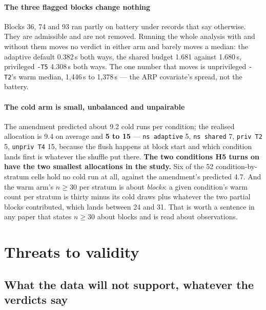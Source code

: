 \documentclass[conference]{IEEEtran}
\begin{document}
\paragraph*{The three flagged blocks change nothing} Blocks 36, 74 and 93 ran
partly on battery under records that say otherwise. They are admissible and are
not removed. Running the whole analysis with and without them moves no verdict
in either arm and barely moves a median: the adaptive default 0.382\,s both
ways, the shared budget 1.681 against 1.680\,s, privileged \texttt{-T5}
4.308\,s both ways. The one number that moves is unprivileged \texttt{-T2}'s
warm median, 1{,}446\,s to 1{,}378\,s --- the ARP covariate's spread, not the
battery.

\paragraph*{The cold arm is small, unbalanced and unpairable} The amendment
predicted about 9.2 cold runs per condition; the realised allocation is 9.4 on
average and \textbf{5 to 15} --- \texttt{ns adaptive} 5, \texttt{ns shared} 7, \texttt{priv T2} 5, \texttt{unpriv T4} 15, because the flush happens
at block start and which condition lands first is whatever the shuffle put
there. \textbf{The two conditions H5 turns on have the two smallest allocations
in the study.} Six of the 52 condition-by-stratum cells hold no cold run at
all, against the amendment's predicted 4.7. And the warm arm's $n\ge30$ per
stratum is about \emph{blocks}: a given condition's warm count per stratum is
thirty minus its cold draws plus whatever the two partial blocks contributed,
which lands between 24 and 31. That is worth a sentence in any paper that
states $n\ge30$ about blocks and is read about observations.


\section{Threats to validity}
\label{sec:threats}

\subsection{What the data will not support, whatever the verdicts say}
\label{sec:notinrecord}
\end{document}
